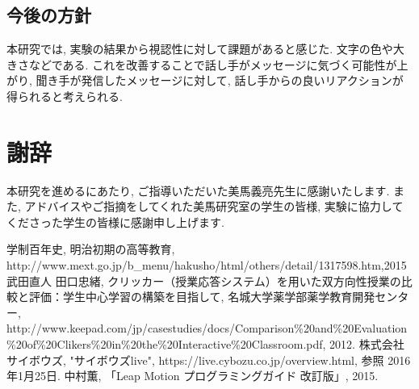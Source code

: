 \documentclass{funthesis}
\begin{document}

\section{今後の方針}
本研究では, 実験の結果から視認性に対して課題があると感じた. 文字の色や大きさなどである. これを改善することで話し手がメッセージに気づく可能性が上がり, 聞き手が発信したメッセージに対して, 話し手からの良いリアクションが得られると考えられる. 



\chapter*{謝辞}
本研究を進めるにあたり, ご指導いただいた美馬義亮先生に感謝いたします. また, アドバイスやご指摘をしてくれた美馬研究室の学生の皆様, 実験に協力してくださった学生の皆様に感謝申し上げます. 


\begin{thebibliography}{9}
  学制百年史, 明治初期の高等教育, http://www.mext.go.jp/b\_menu/hakusho/html/others/detail/1317598.htm,2015
    武田直人 田口忠緒,  クリッカー（授業応答システム）を用いた双方向性授業の比較と評価：学生中心学習の構築を目指して, 名城大学薬学部薬学教育開発センター, http://www.keepad.com/jp/casestudies/docs/Comparison\%20and\%20Evaluation\%20of\%20Clikers\%20in\%20the\%20Interactive\%20Classroom.pdf, 2012.
  株式会社サイボウズ, "サイボウズlive", https://live.cybozu.co.jp/overview.html, 参照 2016年1月25日.
   中村薫, 「Leap Motion プログラミングガイド 改訂版」, 2015.
\end{thebibliography}
\end{document}
